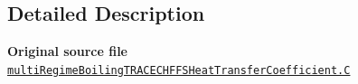 \subsection{Detailed Description}
{\bfseries Original source file} \href{../../../home/carlo/data/GeN-Foam/GeN-Foam_ffn/GeN-Foam/GeN-Foam/classes/thermalHydraulics/src/physicsModels/heatTransferModels/FSHeatTransferCoefficientModels/multiRegimeBoilingTRACECHF/multiRegimeBoilingTRACECHFFSHeatTransferCoefficient.C}{\tt multi\+Regime\+Boiling\+T\+R\+A\+C\+E\+C\+H\+F\+F\+S\+Heat\+Transfer\+Coefficient.\+C} 
